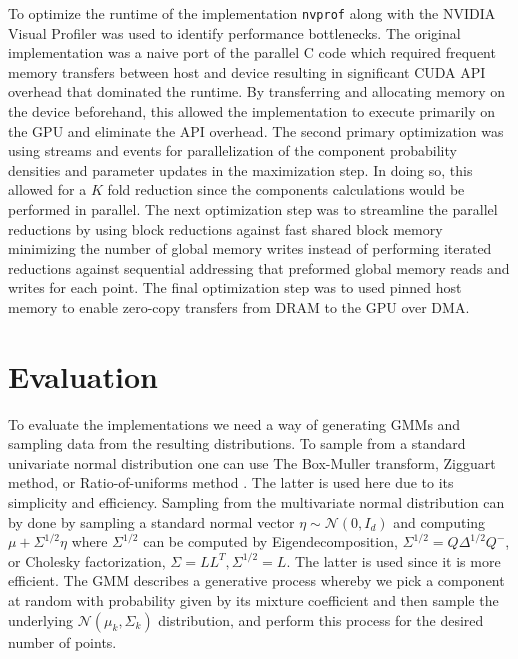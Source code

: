\documentclass{article}
\begin{document}
To optimize the runtime of the implementation \texttt{nvprof} along with the NVIDIA Visual Profiler was used to identify performance bottlenecks. The original implementation was a naive port of the parallel C code which required frequent memory transfers between host and device resulting in significant CUDA API overhead that dominated the runtime. By transferring and allocating memory on the device beforehand, this allowed the implementation to execute primarily on the GPU and eliminate the API overhead. The second primary optimization was using streams and events for parallelization of the component probability densities and parameter updates in the maximization step. In doing so, this allowed for a $K$ fold reduction since the components calculations would be performed in parallel. The next optimization step was to streamline the parallel reductions by using block reductions against fast shared block memory minimizing the number of global memory writes instead of performing iterated reductions against sequential addressing that preformed global memory reads and writes for each point. The final optimization step was to used pinned host memory to enable zero-copy transfers from DRAM to the GPU over DMA. 

\section{Evaluation}

To evaluate the implementations we need a way of generating GMMs and sampling data from the resulting distributions. To sample from a standard univariate normal distribution one can use The Box-Muller transform, Zigguart method, or Ratio-of-uniforms method \cite{kinderman1977computer}. The latter is used here due to its simplicity and efficiency. Sampling from the multivariate normal distribution can by done by sampling a standard normal vector $\eta \sim \mathcal{N}(0 ,I_d)$ and computing $\mu + \Sigma^{1/2} \eta$ where $\Sigma^{1/2}$ can be computed by Eigendecomposition, $\Sigma^{1/2} = Q \Delta^{1/2} Q^{-}$, or Cholesky factorization, $\Sigma = L L^T, \Sigma^{1/2} = L$. The latter is used since it is more efficient. The GMM describes a generative process whereby we pick a component at random with probability given by its mixture coefficient and then sample the underlying $\mathcal{N}(\mu_k, \Sigma_k)$ distribution, and perform this process for the desired number of points.
\end{document}
